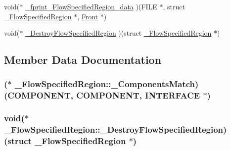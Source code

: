 \begin{DoxyCompactItemize}
\item 
void($\ast$ \hyperlink{struct___flow_specified_region_abae94c0810c1b47db6793d3afd47cb39}{\+\_\+fprint\+\_\+\+Flow\+Specified\+Region\+\_\+data} )(F\+I\+LE $\ast$, struct \hyperlink{struct___flow_specified_region}{\+\_\+\+Flow\+Specified\+Region} $\ast$, \hyperlink{fdecs_8h_ac32202b798f848095c489cfd04c4ca5f}{Front} $\ast$)
\item 
void($\ast$ \hyperlink{struct___flow_specified_region_a5fd0392a9ab4313dd4ca64ef633d49c8}{\+\_\+\+Destroy\+Flow\+Specified\+Region} )(struct \hyperlink{struct___flow_specified_region}{\+\_\+\+Flow\+Specified\+Region} $\ast$)
\end{DoxyCompactItemize}


\subsection{Member Data Documentation}
\subsubsection[{\texorpdfstring{\+\_\+\+Components\+Match}{_ComponentsMatch}}]{($\ast$ \+\_\+\+Flow\+Specified\+Region\+::\+\_\+\+Components\+Match) ({\bf C\+O\+M\+P\+O\+N\+E\+NT}, {\bf C\+O\+M\+P\+O\+N\+E\+NT}, {\bf I\+N\+T\+E\+R\+F\+A\+CE} $\ast$)}\hypertarget{struct___flow_specified_region_a6566a46ef3bd72417e1fc7068285b124}{}\label{struct___flow_specified_region_a6566a46ef3bd72417e1fc7068285b124}
\subsubsection[{\texorpdfstring{\+\_\+\+Destroy\+Flow\+Specified\+Region}{_DestroyFlowSpecifiedRegion}}]{\setlength{\rightskip}{0pt plus 5cm}void($\ast$ \+\_\+\+Flow\+Specified\+Region\+::\+\_\+\+Destroy\+Flow\+Specified\+Region) (struct {\bf \+\_\+\+Flow\+Specified\+Region} $\ast$)}\hypertarget{struct___flow_specified_region_a5fd0392a9ab4313dd4ca64ef633d49c8}{}\label{struct___flow_specified_region_a5fd0392a9ab4313dd4ca64ef633d49c8}
